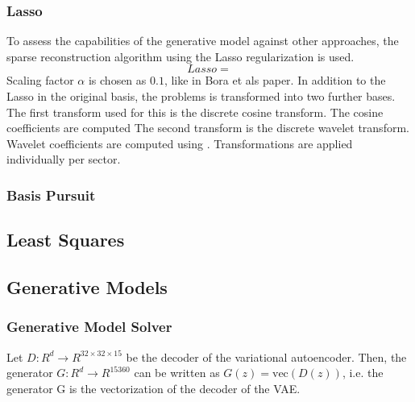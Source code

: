 \subsubsection{Lasso}
To assess the capabilities of the generative model against other approaches, the sparse reconstruction algorithm using the Lasso regularization \parencite{Lasso} is used.
\begin{equation}
    Lasso = 
\end{equation}
Scaling factor $\alpha$ is chosen as $0.1$, like in Bora et als paper.
In addition to the Lasso in the original basis, the problems is transformed into two further bases.
The first transform used for this is the discrete cosine transform.
The cosine coefficients are computed
The second transform is the discrete wavelet transform.
Wavelet coefficients are computed using \parencite{PyWavelets}.
Transformations are applied individually per sector.

\subsubsection{Basis Pursuit}

\subsection{Least Squares}

\subsection{Generative Models}
\subsubsection{Generative Model Solver}
Let $D: R^d \rightarrow R^{32 \times 32 \times 15}$ be the decoder of the variational autoencoder.
Then, the generator $G: R^d \rightarrow R^{15360}$ can be written as $G(z) = \text{vec}(D(z))$, i.e. the generator G is the vectorization of the decoder of the VAE.


